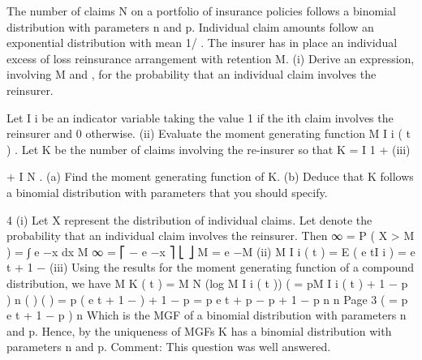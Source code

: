 \documentclass[a4paper,12pt]{article}
\begin{document}
 


The number of claims N on a portfolio of insurance policies follows a binomial
distribution with parameters n and p. Individual claim amounts follow an exponential
distribution with mean 1/ \lambda . The insurer has in place an individual excess of loss
reinsurance arrangement with retention M.
(i)
Derive an expression, involving M and \lambda, for the probability that an individual
claim involves the reinsurer.

Let I i be an indicator variable taking the value 1 if the ith claim involves the reinsurer
and 0 otherwise.
(ii)
Evaluate the moment generating function M I i ( t ) .
Let K be the number of claims involving the re-insurer so that K = I 1 +
(iii)


+ I N .
(a) Find the moment generating function of K.
(b) Deduce that K follows a binomial distribution with parameters that you
should specify.



4
(i)
Let X represent the distribution of individual claims. Let denote the
probability that an individual claim involves the reinsurer. Then
∞
\pi  = P ( X > M ) =
∫ \lambda e
−\lambda x
dx
M
∞
= ⎡ − e −\lambda x ⎤
⎣
⎦ M
= e −\lambda M
(ii) M I i ( t ) = E ( e tI i ) = \pi  e t + 1 − \pi 
(iii) Using the results for the moment generating function of a compound
distribution, we have
M K ( t ) = M N (log M I i ( t ))
(
= pM I i ( t ) + 1 − p
)
n
( )
( )
= p ( \pi  e t + 1 − \pi  ) + 1 − p
= p \pi  e t + p − p \pi  + 1 − p
n
n
Page 3%
(
= p \pi  e t + 1 − p \pi 
)
n
Which is the MGF of a binomial distribution with parameters n and p\pi  .
Hence, by the uniqueness of MGFs K has a binomial distribution with
parameters n and p\pi  .
Comment: This question was well answered.
\end{document}
